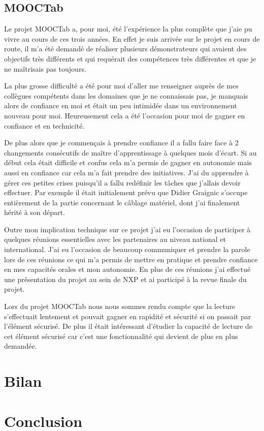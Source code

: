 \documentclass[french,12pt,a4paper,titlepage,openright,openbib]{report}
\begin{document}
\section{MOOCTab}

Le projet MOOCTab a, pour moi, été l'expérience la plus complète que j'aie pu  vivre au cours de ces trois années. En effet je suis arrivée sur le projet en cours de route, il m'a été demandé de réaliser plusieurs démonstrateurs qui avaient des objectifs très différents et qui requérait des compétences très différentes et que je ne maîtrisais pas toujours.

La plus grosse difficulté a été pour moi d'aller me renseigner auprès de mes collègues compétents dans les domaines que je ne connaissais pas, je manquais alors de confiance en moi et était un peu intimidée dans un environnement nouveau pour moi. Heureusement cela a été l'occasion pour moi de gagner en confiance et en technicité.

De plus alors que je commençais à prendre confiance il a fallu faire face à 2 changements consécutifs de maître d'apprentissage à quelques mois d'écart. Si au début cela était difficile et confus cela m'a permis de gagner en autonomie mais aussi en confiance car cela m'a fait prendre des initiatives. J'ai du apprendre à gérer ces petites crises puisqu'il a fallu redéfinir les tâches que j'allais devoir effectuer. Par exemple il était initialement prévu que Didier Graignic s'occupe entièrement de la partie concernant le câblage matériel, dont j'ai finalement hérité à son départ.

Outre mon implication technique sur ce projet j'ai eu l'occasion de participer à quelques réunions essentielles avec les partenaires au niveau national et international. J'ai eu l'occasion de beaucoup communiquer et prendre la parole lors de ces réunions ce qui m'a permis de mettre en pratique et prendre confiance en mes capacités orales et mon autonomie.
En plus de ces réunions j'ai effectué une présentation du projet au sein de NXP et ai participé à la revue finale du projet.

Lors du projet MOOCTab nous nous sommes rendu compte que la lecture s'effectuait lentement et pouvait gagner en rapidité et sécurité si on passait par l'élément sécurisé. De plus il était intéressant d'étudier la capacité de lecture de cet élément sécurisé car c'est une fonctionnalité qui devient de plus en plus demandée.


\chapter{Bilan}


\chapter{Conclusion}

\printglossary[title={Glossaire}]

{}

	
\end{document}
